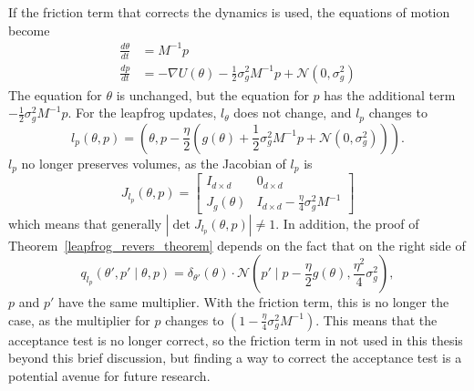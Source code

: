 \documentclass[english,twoside,openright]{HYgraduMLDS}
\newcommand{\caln}{{\mathcal{N}}}
\begin{document}

If the friction term that corrects the dynamics is used, the equations of
motion become~\cite{CFG14}
\begin{align*}
  \frac{d\theta}{dt} &= M^{-1}p \\
  \frac{dp}{dt} &= -\nabla U(\theta) - \frac{1}{2}\sigma_{g}^{2}M^{-1}p + \caln(0, \sigma_{g}^{2})
\end{align*}
The equation for \(\theta\) is unchanged, but the equation for \(p\) has the
additional term \(-\frac{1}{2}\sigma_{g}^{2}M^{-1}p\).
For the leapfrog updates, \(l_{\theta}\) does not change, and \(l_{p}\) changes
to
\[
  l_{p}(\theta, p) = \left(\theta, p - \frac{\eta}{2}(g(\theta)
  + \frac{1}{2}\sigma_{g}^{2}M^{-1}p + \caln(0, \sigma_{g}^{2}))\right).
\]
\(l_{p}\) no longer preserves volumes, as the Jacobian of \(l_{p}\) is
\[
  J_{l_{p}}(\theta, p) =
  \begin{bmatrix}
    I_{d\times d} & 0_{d\times d} \\
    J_{g}(\theta) & I_{d\times d} - \frac{\eta}{4}\sigma_{g}^{2}M^{-1}
  \end{bmatrix}
\]
which means that generally \(|\det J_{l_{p}}(\theta, p)| \neq 1\).
In addition, the proof of Theorem~\ref{leapfrog_revers_theorem} depends on the
fact that on the right side of
\[
  q_{l_{p}}(\theta', p'\mid \theta, p)
  = \delta_{\theta'}(\theta)\cdot \caln\left(p'\mid p
    - \frac{\eta}{2}g(\theta), \frac{\eta^{2}}{4}\sigma_{g}^{2}\right),
\]
\(p\) and \(p'\) have the same multiplier. With the friction term, this is
no longer the case, as the multiplier for \(p\) changes to
\((1 - \frac{\eta}{4}\sigma_{g}^{2}M^{-1})\).
This means that the acceptance test is no longer correct, so
the friction term in not used in this thesis beyond this brief discussion,
but finding a way to correct the acceptance test is a potential avenue for
future research.
\end{document}

